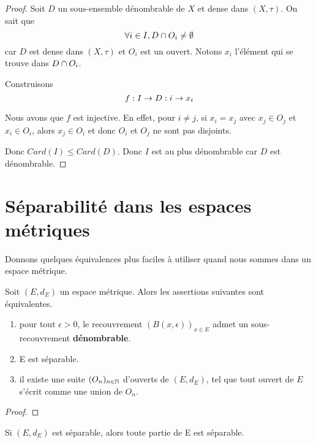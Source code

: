 \ifdefined\outputproof
\begin{proof}
	Soit $D$ un sous-ensemble dénombrable de $X$ et dense dans $(X, \tau)$. On sait que
	\begin{equation}
		\forall i \in I, D \cap O_{i} \neq \emptyset
	\end{equation}
	car $D$ est dense dans $(X, \tau)$ et $O_{i}$ est un ouvert.
	Notons $x_{i}$ l'élément qui se trouve dans $D \cap O_{i}$.

	Construisons
	\begin{equation}
		f : I \rightarrow D : i \rightarrow x_{i}
	\end{equation}

	Nous avons que $f$ est injective.
	En effet, pour $i \neq j$, si $x_{i} = x_{j}$ avec $x_{j} \in O_{j}$ et
	$x_{i} \in O_{i}$, alors $x_{j} \in O_{i}$ et donc $O_{i}$ et $O_{j}$ ne sont pas
	disjoints.

	Donc $Card(I) \leq Card(D)$. Donc $I$ est au plus dénombrable car $D$ est
	dénombrable.
\end{proof}
\fi

\section{Séparabilité dans les espaces métriques}

Donnons quelques équivalences plus faciles à utiliser quand nous sommes dans un
espace métrique.

\begin{proposition}
	Soit $(E, d_{E})$ un espace métrique. Alors les assertions suivantes sont
	équivalentes.
	\begin{enumerate}
		\item pour tout $\epsilon > 0$, le recouvrement $(B(x, \epsilon))_{x \in
			E}$ admet un sous-recouvrement \textbf{dénombrable}.
		\item E est séparable.
		\item il existe une suite $(O_{n})_{n \in \mathbb{N}}$ d'ouverts de $(E,
			d_{E})$, tel que tout ouvert de $E$ s'écrit comme une union de $O_{n}$.
	\end{enumerate}
\end{proposition}

\ifdefined\outputproof
\begin{proof}

\end{proof}
\fi

\begin{proposition}
	Si $(E, d_{E})$ est séparable, alors toute partie de E est séparable.
\end{proposition}


